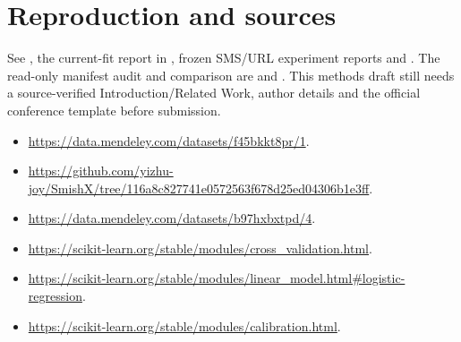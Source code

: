 \documentclass[11pt]{article}
\begin{document}
\clearpage
\section{Reproduction and sources}
See , the current-fit report in
, frozen SMS/URL experiment reports and
. The read-only manifest audit and
comparison are  and
.
This methods draft still needs a source-verified Introduction/Related Work,
author details and the official conference template before submission.
\begin{itemize}
\item \url{https://data.mendeley.com/datasets/f45bkkt8pr/1}.
\item \url{https://github.com/yizhu-joy/SmishX/tree/116a8c827741e0572563f678d25ed04306b1e3ff}.
\item \url{https://data.mendeley.com/datasets/b97hxbxtpd/4}.
\item \url{https://scikit-learn.org/stable/modules/cross_validation.html}.
\item \url{https://scikit-learn.org/stable/modules/linear_model.html#logistic-regression}.
\item \url{https://scikit-learn.org/stable/modules/calibration.html}.
\end{itemize}
\end{document}
